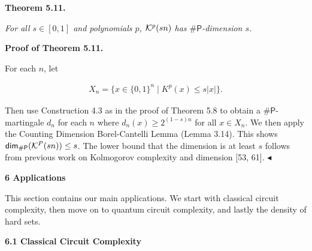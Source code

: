 

\par\medskip\noindent\textbf{
\textbf{Theorem 5.11}\textbf{.}
}\par



\emph{For all $s\in[0,1]$ and polynomials $p$, ${\cal K}^{p}(sn)$ has ${\mathsf{\#}\mathsf{P}}$-dimension $s$.}\par







\par\medskip\noindent\textbf{Proof of Theorem 5.11.}\par




For each $n$, let\par


\[\begin{gathered}
X_{n}=\{x\in\{0,1\}^{n}\mid K^{p}(x)\leq s|x|\}.
\end{gathered}\]


Then use Construction 4.3 as in the proof of Theorem 5.8 to obtain a ${\mathsf{\#}\mathsf{P}}$-martingale $d_{n}$ for each $n$ where $d_{n}(x)\geq 2^{(1-s)n}$ for all $x\in X_{n}.$ We then apply the Counting Dimension Borel-Cantelli Lemma (Lemma 3.14).
This shows ${\mathsf{dim}}_{{\mathsf{\#}\mathsf{P}}}({\cal K}^{P}(sn))\leq s$. The lower bound that the dimension is at least $s$ follows from previous work on Kolmogorov complexity and dimension [53, 61].
$\blacktriangleleft$\par







\par\medskip\noindent\textbf{
6 Applications}\par




This section contains our main applications. We start with classical circuit complexity, then move on to quantum circuit complexity, and lastly the density of hard sets.\par




\par\medskip\noindent\textbf{
6.1 Classical Circuit Complexity}\par




